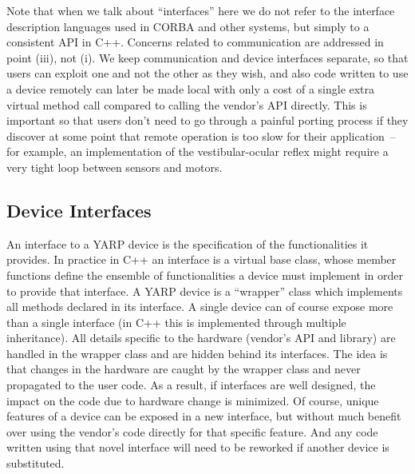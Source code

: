 Note that when we talk about ``interfaces'' here we do not refer to
the interface description languages used in CORBA and other systems,
but simply to a consistent API in C++.  Concerns related to
communication are addressed in point (iii), not (i).  We keep
communication and device interfaces separate, so that users can
exploit one and not the other as they wish, and also code written to
use a device remotely can later be made local with only a cost of a
single extra virtual method call compared to calling the vendor's API directly.
This is important so that users don't need to go through a painful
porting process if they discover at some point that remote operation
is too slow for their application~-- for example, an implementation
of the vestibular-ocular reflex might require a very tight loop
between sensors and motors.


\subsection{Device Interfaces}
An interface to a YARP device is the specification of the functionalities
it provides. In practice in C++ an interface is a virtual base class, whose 
member functions define the ensemble of  functionalities a device must 
implement in order to provide that interface.  A YARP device is a 
``wrapper'' class which implements all methods declared in its interface. 
A single device can of course expose more than a single interface 
(in C++ this is implemented through multiple
inheritance). All details specific to the hardware 
(vendor's API and library) are handled in the wrapper class and are 
hidden behind its interfaces. 
The idea is that changes in the hardware are caught by the wrapper class 
and never propagated to the user code. As a result, if interfaces are 
well designed, the impact on the code due to hardware change is minimized. 
%
Of course, unique features of a device can be exposed in a new interface,
but without much benefit over using the vendor's code directly for that
specific feature.  And any code written using that novel interface will
need to be reworked if another device is substituted.


